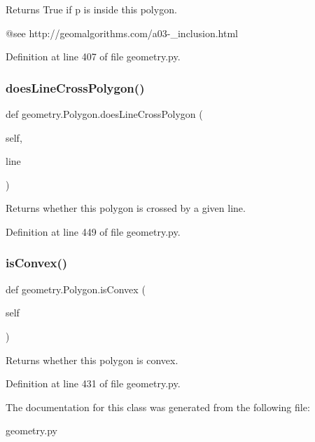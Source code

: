 \begin{DoxyVerb}Returns True if p is inside this polygon.

   @see http://geomalgorithms.com/a03-_inclusion.html
\end{DoxyVerb}
 

Definition at line 407 of file geometry.\+py.

\mbox{\label{classgeometry_1_1Polygon_ae4ab82f837783f51b39a41427e46f5df}} 
\subsubsection{\texorpdfstring{does\+Line\+Cross\+Polygon()}{doesLineCrossPolygon()}}
{\footnotesize\ttfamily def geometry.\+Polygon.\+does\+Line\+Cross\+Polygon (\begin{DoxyParamCaption}\item[{}]{self,  }\item[{}]{line }\end{DoxyParamCaption})}

\begin{DoxyVerb}Returns whether this polygon is crossed by a given line.\end{DoxyVerb}
 

Definition at line 449 of file geometry.\+py.

\mbox{\label{classgeometry_1_1Polygon_a4836c37e04dc0eb76809904538b77e7c}} 
\subsubsection{\texorpdfstring{is\+Convex()}{isConvex()}}
{\footnotesize\ttfamily def geometry.\+Polygon.\+is\+Convex (\begin{DoxyParamCaption}\item[{}]{self }\end{DoxyParamCaption})}

\begin{DoxyVerb}Returns whether this polygon is convex.\end{DoxyVerb}
 

Definition at line 431 of file geometry.\+py.



The documentation for this class was generated from the following file\+:\begin{DoxyCompactItemize}
\item 
geometry.\+py\end{DoxyCompactItemize}
